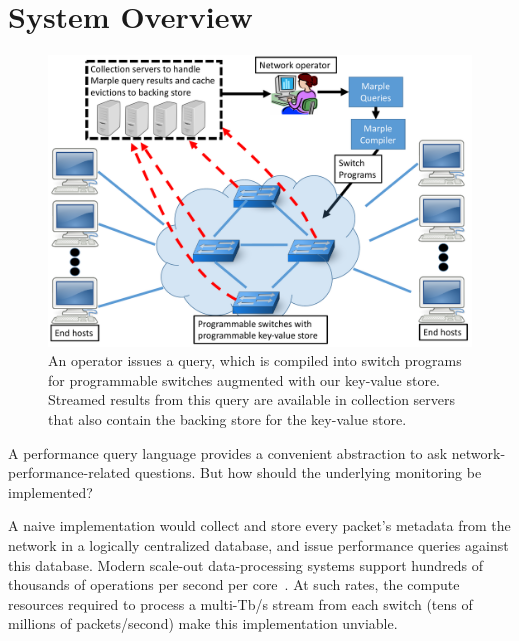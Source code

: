 \section{System Overview}
\label{s:overview}
\begin{figure}
\includegraphics[width=\columnwidth]{pq_overview.pdf}
\caption{An operator issues a \TheSystem query, which is compiled into
switch programs for programmable switches augmented with our
key-value store. Streamed results from this query are available in
collection servers that also contain the backing store for the key-value
store.}
\label{fig:overview}
\end{figure}

A performance query language provides a convenient abstraction to ask
network-performance-related questions. But how should the underlying monitoring
be implemented?

A naive implementation would collect and store every packet's metadata
from the network in a logically centralized database, and issue performance
queries against this database. %
Modern scale-out data-processing systems support hundreds of thousands of
operations per second per core~\cite{kafka_benchmark, redis_benchmark,
  memcached_benchmark, redis_vs_memcached, redis_vs_memcached_update}. At such
rates, the compute resources required to process a multi-Tb/s stream from each
switch (tens of millions of packets/second) make this implementation
unviable.


